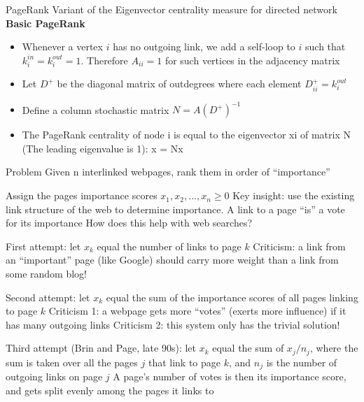 \documentclass[aspectratio=169]{beamer}\usepackage[]{graphicx}\usepackage[]{xcolor}
\begin{document}
\begin{frame}{PageRank}
Variant of the Eigenvector centrality measure for directed network
\vfill
\textbf{Basic PageRank}
\begin{itemize}
\item Whenever a vertex $i$ has no outgoing link, we add a self-loop to $i$ such that $k^{in}_i=k^{out}_i=1$. Therefore $A_{ii}=1$ for such vertices in the adjacency matrix
\item Let $D^+$ be the diagonal matrix of outdegrees where each element $D_{ii}^+ = k_i^{out}$
\item Define a column stochastic matrix $N = A(D^+)^{-1}$
\item
The PageRank centrality of node i is equal to the 
eigenvector xi of matrix N (The leading eigenvalue is 1):
x = Nx
\end{itemize}
\end{frame}


\begin{frame}
	\begin{block}{Problem}
		Given n interlinked webpages, rank them in order of ``importance''
	\end{block}
	\vfill
Assign the pages importance scores $x_1, x_2,\ldots, x_n\geq 0$
\vfill
Key insight: use the existing link structure of the web to determine importance. A link to a page ``is'' a vote for its importance
\vfill
How does this help with web searches?
\end{frame}


\begin{frame}{}
	First attempt: let $x_k$ equal the number of links to page $k$
\vfill
	Criticism: a link from an ``important'' page (like Google) should carry more weight than a link from some random blog!
\end{frame}

\begin{frame}{}
	Second attempt: let $x_k$ equal the sum of the importance scores of all pages linking to page $k$
	\vfill
	Criticism 1: a webpage gets more ``votes'' (exerts more influence) if it has many outgoing links
	\vfill
	Criticism 2: this system only has the trivial solution!	
\end{frame}


\begin{frame}{}
	Third attempt (Brin and Page, late 90s): let $x_k$ equal the sum of $x_j/n_j$, where
	the sum is taken over all the pages $j$ that link to page $k$, and $n_j$ is the number of outgoing links on page $j$
	\vfill
	A page's number of votes is then its importance score, and gets split evenly among the pages it links to
\end{frame}
\end{document}
